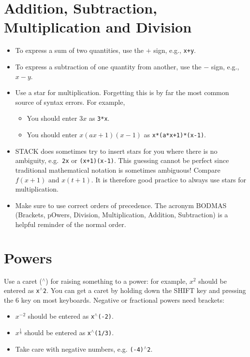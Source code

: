 \documentclass[a4paper]{article}
\newcommand{\stack}[1]{{\color{red}\tt #1}}
\begin{document}
\begin{multicols}{2}
\section*{Addition, Subtraction, Multiplication and Division}
\begin{itemize}
\item To express a sum of two quantities, use the $+$ sign, e.g., \stack{x+y}.
\item To express a subtraction of one quantity from another, use the $-$ sign, e.g., $x-y$.
\item Use a star for multiplication. Forgetting this is by far the most common source of syntax errors. For example,
\begin{itemize}
\item You should enter $3x$ as \stack{3*x}.
\item You should enter $x(ax+1)(x-1)$ as \stack{x*(a*x+1)*(x-1)}.
\end{itemize}
\item STACK does sometimes try to insert stars for you where there is no ambiguity, e.g.~\stack{2x} or \stack{(x+1)(x-1)}. This guessing cannot be perfect since traditional mathematical notation is sometimes ambiguous! Compare $f(x+1)$ and $x(t+1)$. It is therefore good practice to always use stars for multiplication.
\item Make sure to use correct orders of precedence. The acronym BODMAS (Brackets, pOwers, Division, Multiplication, Addition, Subtraction) is a helpful reminder of the normal order.
\end{itemize}

\section*{Powers}
Use a caret ($^{\wedge}$) for raising something to a power: for example, $x^2$ should be entered as \stack{x$^{\wedge}$2}. You can get a caret by holding down the SHIFT key and pressing the 6 key on most keyboards. Negative or fractional powers need brackets:
\begin{itemize}
\item $x^{-2}$ should be entered as \stack{x$^{\wedge}$(-2)}.
\item $x^{\frac{1}{3}}$ should be entered as \stack{x$^{\wedge}$(1/3)}.
\item Take care with negative numbers, e.g. \stack{(-4)$^{\wedge}$2}.
\end{itemize}


\end{multicols}
\end{document}
